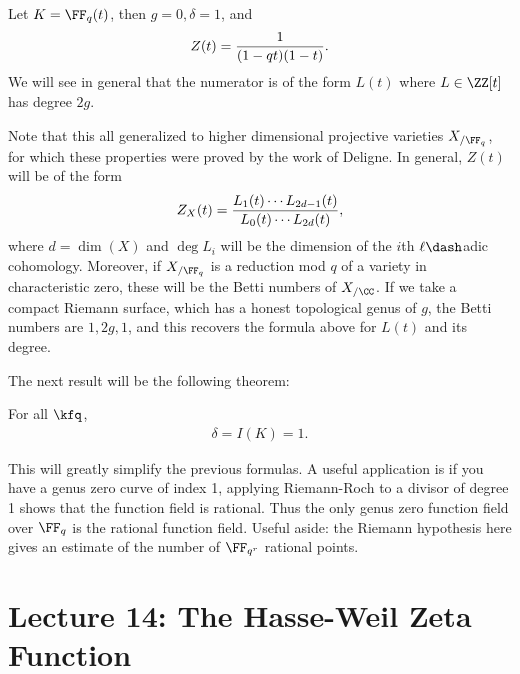 \begin{exercise}[?]

Let \(K = \FF_q(t)\), then \(g=0, \delta = 1\), and
\begin{align*}  
Z(t) = {1\over (1-qt)(1-t)}
.\end{align*} We will see in general that the numerator is of the form
\(L(t)\) where \(L\in \ZZ[t]\) has degree \(2g\).

\end{exercise}

Note that this all generalized to higher dimensional projective
varieties \(X_{/\FF_q}\), for which these properties were proved by the
work of Deligne. In general, \(Z(t)\) will be of the form
\begin{align*}  
Z_X(t) = {L_1(t) \cdots L_{2d-1}(t) \over L_0(t) \cdots L_{2d}(t)}
,\end{align*} where \(d = \dim(X)\) and \(\deg L_i\) will be the
dimension of the \(i\)th \(\ell\dash\)adic cohomology. Moreover, if
\(X_{/\FF_q}\) is a reduction mod \(q\) of a variety in characteristic
zero, these will be the Betti numbers of \(X_{/\CC}\). If we take a
compact Riemann surface, which has a honest topological genus of \(g\),
the Betti numbers are \(1, 2g, 1\), and this recovers the formula above
for \(L(t)\) and its degree.

The next result will be the following theorem:

\begin{theorem}

For all \(\kfq\),
\begin{align*}  
\delta = I(K) = 1
.\end{align*}

\end{theorem}

This will greatly simplify the previous formulas. A useful application
is if you have a genus zero curve of index 1, applying Riemann-Roch to a
divisor of degree 1 shows that the function field is rational. Thus the
only genus zero function field over \(\FF_q\) is the rational function
field. Useful aside: the Riemann hypothesis here gives an estimate of
the number of \(\FF_{q^r}\) rational points.

\hypertarget{lecture-14-the-hasse-weil-zeta-function}{%
\section{Lecture 14: The Hasse-Weil Zeta
Function}\label{lecture-14-the-hasse-weil-zeta-function}}

